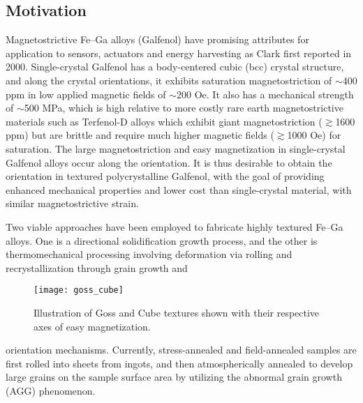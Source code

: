 %
%

\subsection{Motivation}\label{abnormal-grain-growth}
%

 Magnetostrictive Fe–Ga alloys (Galfenol) have promising attributes for application to sensors, actuators and energy harvesting as Clark \etal first reported in 2000\cite{clark2000magnetostrictive}. Single-crystal Galfenol has a body-centered cubic (bcc) crystal structure, and along the  crystal orientations, it exhibits saturation magnetostriction of $\sim$400 ppm in low applied magnetic fields of $\sim$200 Oe. It also has a mechanical strength of $\sim$500 MPa, which is high relative to more costly rare earth magnetostrictive materials such as Terfenol-D alloys which exhibit giant magnetostriction ($\gtrsim$1600 ppm) but are brittle and require much higher magnetic fields ($\gtrsim$1000 Oe) for saturation\cite{clark2000magnetostrictive,Clark2003,Guruswamy2000}. The large magnetostriction and easy magnetization in single-crystal Galfenol alloys occur along the  orientation. It is thus desirable to obtain the  orientation in textured polycrystalline Galfenol, with the goal of providing enhanced mechanical properties and lower cost than single-crystal material, with similar magnetostrictive strain. 




 Two viable approaches have been employed to fabricate highly textured Fe–Ga alloys\cite{srisukhumbowornchai2001large,kellogg2003texture}. One is a directional solidification growth process, and the other is thermomechanical processing involving deformation via rolling and recrystallization through grain growth and  
\begin{figure}[h]
	\centering
	\texttt{[image: goss\_cube]}
	\caption{Illustration of Goss and Cube textures shown with their respective axes of easy magnetization.}
	\label{fig:goss_cube}	
\end{figure}
 orientation mechanisms. Currently, stress-annealed and field-annealed samples are first rolled into sheets from ingots, and then atmospherically annealed to develop large grains on the sample surface area by utilizing the abnormal grain growth (AGG) phenomenon. 


